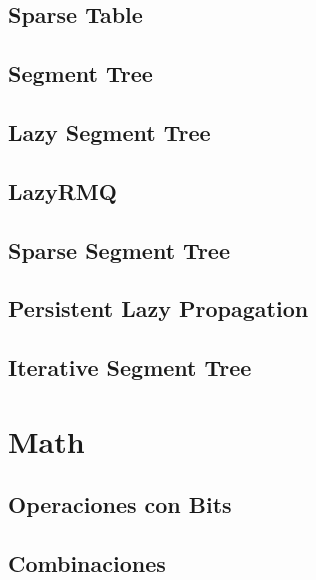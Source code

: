 \subsection{Sparse Table}
\raggedbottom
\hrulefill
\subsection{Segment Tree}
\raggedbottom
\hrulefill
\subsection{Lazy Segment Tree}
\raggedbottom
\hrulefill
\subsection{LazyRMQ}
\raggedbottom
\hrulefill
\subsection{Sparse Segment Tree}
\raggedbottom
\hrulefill
\subsection{Persistent Lazy Propagation}
\raggedbottom
\hrulefill
\subsection{Iterative Segment Tree}
\raggedbottom
\hrulefill
\newpage

\section{Math}
\subsection{Operaciones con Bits}
\raggedbottom
\hrulefill
\subsection{Combinaciones}
\raggedbottom
\hrulefill
